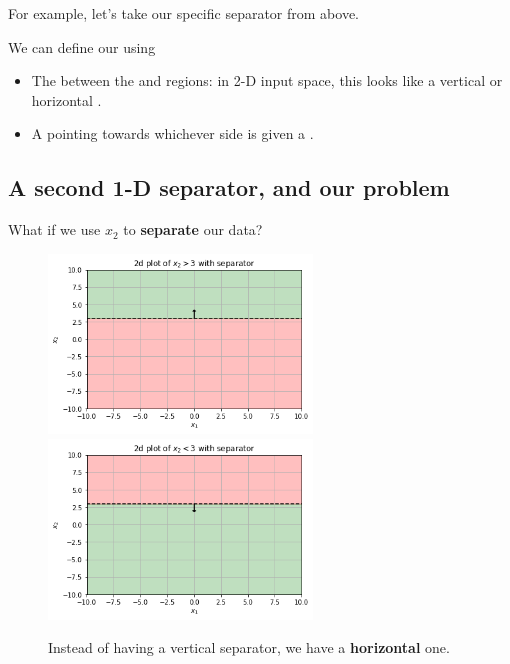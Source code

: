         
        For example, let's take our specific separator from above.\\
        
        \begin{concept}
            We can define our  using
            
            \begin{itemize}
                \item The  between the  and  regions: in 2-D input space, this looks like a vertical or horizontal .
                
                \item A  pointing towards whichever side is given a .
            \end{itemize}
        \end{concept}
    
    \subsection*{A second 1-D separator, and our problem}
        
        What if we use $x_2$ to \textbf{separate} our data?
        
        \begin{figure}[H]
                \includegraphics[width=70mm,scale=0.5]{images/classification_images/x2_2d_plot_separator.png}
                \includegraphics[width=70mm,scale=0.5]{images/classification_images/x2_2d_plot_separator_reversed.png}
                
                \caption*{Instead of having a vertical separator, we have a \textbf{horizontal} one.}
        \end{figure}
        
